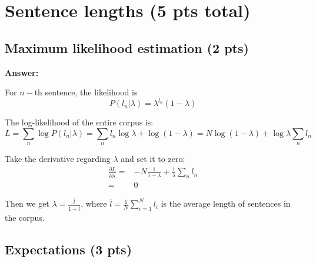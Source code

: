 \documentclass[twoside,11pt]{article}\usepackage{amsmath,amsfonts,amsthm,fullpage}
\begin{document}
\section{Sentence lengths (5 pts total)}

\subsection{Maximum likelihood estimation (2 pts)}

\textbf{Answer:}

	For $n-$th sentence, the likelihood is
\[
	P(l_n | \lambda) = \lambda^{l_n}(1 - \lambda)
\]

	The log-likelihood of the entire corpus is:
\[
	L = \sum_n \log P(l_n | \lambda) = \sum_n l_n \log \lambda + \log (1 - \lambda) = N\log(1 - \lambda) + \log \lambda \sum_n l_n
\]
	
	Take the derivative regarding $\lambda$ and set it to zero:
\begin{align*}
	\frac{\partial L}{\partial \lambda} =& - N \frac{1}{1 - \lambda} + \frac{1}{\lambda} \sum_n l_n \\
		=& 0
\end{align*}

	Then we get $\lambda = \frac{\bar{l}}{1 + \bar{l}}$, where $\bar{l} = \frac{1}{N} \sum_{i=1}^N l_i$ is the average length of sentences in the corpus.
	
\subsection{Expectations (3 pts)}
\end{document}

